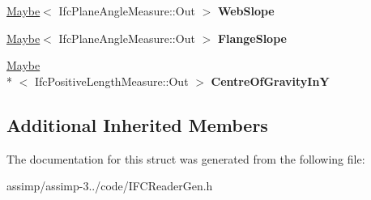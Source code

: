 \begin{DoxyCompactItemize}
\item 
\hypertarget{struct_assimp_1_1_i_f_c_1_1_ifc_t_shape_profile_def_ad6639460e7c067e2cee7fe26efe08ecd}{\hyperlink{struct_assimp_1_1_s_t_e_p_1_1_maybe}{Maybe}$<$ Ifc\+Plane\+Angle\+Measure\+::\+Out $>$ {\bfseries Web\+Slope}}\label{struct_assimp_1_1_i_f_c_1_1_ifc_t_shape_profile_def_ad6639460e7c067e2cee7fe26efe08ecd}

\item 
\hypertarget{struct_assimp_1_1_i_f_c_1_1_ifc_t_shape_profile_def_a0d30c083ff8503474708b81f4fae423b}{\hyperlink{struct_assimp_1_1_s_t_e_p_1_1_maybe}{Maybe}$<$ Ifc\+Plane\+Angle\+Measure\+::\+Out $>$ {\bfseries Flange\+Slope}}\label{struct_assimp_1_1_i_f_c_1_1_ifc_t_shape_profile_def_a0d30c083ff8503474708b81f4fae423b}

\item 
\hypertarget{struct_assimp_1_1_i_f_c_1_1_ifc_t_shape_profile_def_a933a8a76e223bfcc25cdcca4cd053bed}{\hyperlink{struct_assimp_1_1_s_t_e_p_1_1_maybe}{Maybe}\\*
$<$ Ifc\+Positive\+Length\+Measure\+::\+Out $>$ {\bfseries Centre\+Of\+Gravity\+In\+Y}}\label{struct_assimp_1_1_i_f_c_1_1_ifc_t_shape_profile_def_a933a8a76e223bfcc25cdcca4cd053bed}

\end{DoxyCompactItemize}
\subsection*{Additional Inherited Members}


The documentation for this struct was generated from the following file\+:\begin{DoxyCompactItemize}
\item 
assimp/assimp-\/3../code/I\+F\+C\+Reader\+Gen.\+h\end{DoxyCompactItemize}
